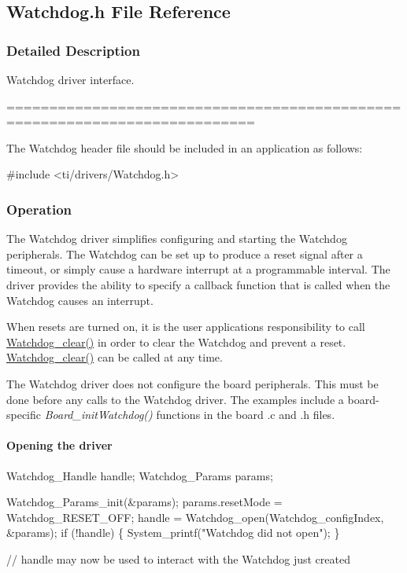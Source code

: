 \subsection{Watchdog.\+h File Reference}
\label{_watchdog_8h}


\subsubsection{Detailed Description}
Watchdog driver interface. 

===========================================================================

The Watchdog header file should be included in an application as follows\+: 
\begin{DoxyCode}
\textcolor{preprocessor}{#include <ti/drivers/Watchdog.h>}
\end{DoxyCode}


\subsubsection*{Operation}

The Watchdog driver simplifies configuring and starting the Watchdog peripherals. The Watchdog can be set up to produce a reset signal after a timeout, or simply cause a hardware interrupt at a programmable interval. The driver provides the ability to specify a callback function that is called when the Watchdog causes an interrupt.

When resets are turned on, it is the user application\textquotesingle{}s responsibility to call \hyperlink{_watchdog_8h_a396decd6b1807db10c636f9987c3be4c}{Watchdog\+\_\+clear()} in order to clear the Watchdog and prevent a reset. \hyperlink{_watchdog_8h_a396decd6b1807db10c636f9987c3be4c}{Watchdog\+\_\+clear()} can be called at any time.

The Watchdog driver does not configure the board peripherals. This must be done before any calls to the Watchdog driver. The examples include a board-\/specific {\itshape Board\+\_\+init\+Watchdog()} functions in the board .c and .h files.

\paragraph*{Opening the driver}


\begin{DoxyCode}
Watchdog_Handle     handle;
Watchdog_Params     params;

Watchdog_Params_init(&params);
params.resetMode = Watchdog_RESET_OFF;
handle = Watchdog_open(Watchdog\_configIndex, &params);
\textcolor{keywordflow}{if} (!handle) \{
    System\_printf(\textcolor{stringliteral}{"Watchdog did not open"});
\}

\textcolor{comment}{// handle may now be used to interact with the Watchdog just created}
\end{DoxyCode}


